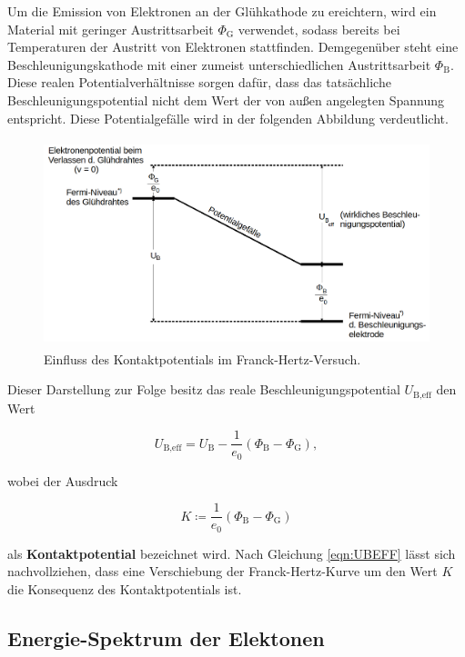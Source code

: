 Um die Emission von Elektronen an der Glühkathode zu ereichtern, wird ein Material mit geringer Austrittsarbeit $\Phi_\text{G}$ verwendet, sodass bereits bei 
Temperaturen der Austritt von Elektronen stattfinden. Demgegenüber steht eine Beschleunigungskathode mit einer zumeist unterschiedlichen Austrittsarbeit $\Phi_\text{B}$.
Diese realen Potentialverhältnisse sorgen dafür, dass das tatsächliche Beschleunigungspotential nicht dem Wert der von außen angelegten Spannung entspricht. 
Diese Potentialgefälle wird in der folgenden Abbildung verdeutlicht.

\begin{figure}
    \centering
    \includegraphics[height=6cm]{content/Kontaktpotential.png}
    \caption{Einfluss des Kontaktpotentials im Franck-Hertz-Versuch\cite{Versuchsanleitung_v601}.}
    \label{fig:Kontaktpotential}
\end{figure}

\noindent Dieser Darstellung zur Folge besitz das reale Beschleunigungspotential $U_\text{B,eff}$ den Wert

\begin{equation}
    U_\text{B,eff} = U_\text{B} - \frac{1}{e_0}\left(\Phi_\text{B} - \Phi_\text{G}\right),
\label{eqn:UBEFF}
\end{equation}

\noindent wobei der Ausdruck 

\begin{equation*}
    K \coloneqq \frac{1}{e_0}\left(\Phi_\text{B} - \Phi_\text{G}\right)
\end{equation*}

\noindent als \textbf{Kontaktpotential} bezeichnet wird. Nach Gleichung \eqref{eqn:UBEFF} lässt sich nachvollziehen, dass eine Verschiebung der Franck-Hertz-Kurve 
um den Wert $K$ die Konsequenz des Kontaktpotentials ist. 

\subsection*{Energie-Spektrum der Elektonen}

